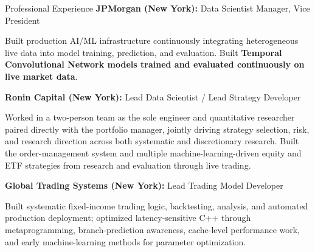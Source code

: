\begin{rubric}{Professional Experience}
  \entry*[2018--2021]%
  \textbf{JPMorgan (New York):} Data Scientist Manager, Vice President
  \par
  Built production AI/ML infrastructure continuously integrating heterogeneous live data into model
  training, prediction, and evaluation. Built \textbf{Temporal Convolutional Network models trained and
  evaluated continuously on live market data}.

  \entry*[2015--2018]%
  \textbf{Ronin Capital (New York):} Lead Data Scientist / Lead Strategy Developer
  \par
  Worked in a two-person team as the sole engineer and quantitative researcher paired directly with the
  portfolio manager, jointly driving strategy selection, risk, and research direction across both
  systematic and discretionary research. Built the order-management system and multiple
  machine-learning-driven equity and ETF strategies from research and evaluation through live trading.

  \entry*[2013--2015]%
  \textbf{Global Trading Systems (New York):} Lead Trading Model Developer
  \par
  Built systematic fixed-income trading logic, backtesting, analysis, and automated production deployment;
  optimized latency-sensitive C++ through metaprogramming, branch-prediction awareness, cache-level
  performance work, and early machine-learning methods for parameter optimization.

\end{rubric}
